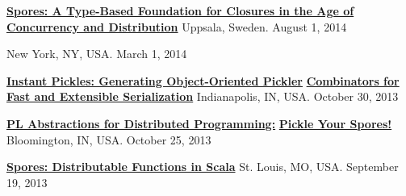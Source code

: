 \documentclass[9pt]{article}
\begin{document}
\noindent\href{https://speakerdeck.com/heathermiller/spores-a-type-based-foundation-for-closures-in-the-age-of-concurrency-and-distribution}{\bf Spores: A Type-Based Foundation for Closures in the Age of} \vspace{-0.03in}
\linebreak\noindent\href{https://speakerdeck.com/heathermiller/spores-a-type-based-foundation-for-closures-in-the-age-of-concurrency-and-distribution}{\bf Concurrency and Distribution}\dates{}
\linebreak\noindent Uppsala, Sweden. August 1, 2014
\bigskip

 \vspace{-0.03in}
\linebreak{}\dates{}
\linebreak\noindent New York, NY, USA. March 1, 2014
\bigskip

\noindent\href{https://speakerdeck.com/heathermiller/instant-pickles-generating-object-oriented-pickler-combinators-for-fast-and-extensible-serialization}{\bf Instant Pickles: Generating Object-Oriented Pickler} \vspace{-0.03in}
\linebreak\noindent\href{https://speakerdeck.com/heathermiller/instant-pickles-generating-object-oriented-pickler-combinators-for-fast-and-extensible-serialization}{\bf Combinators for Fast and Extensible Serialization}\dates{}
\linebreak\noindent Indianapolis, IN, USA. October 30, 2013
\bigskip

\noindent\href{http://heather.miller.am/files/IU-PL-Abstractions-for-Dist-Programming.pdf}{\bf PL Abstractions for Distributed Programming:} \vspace{-0.03in}
\linebreak\noindent\href{http://heather.miller.am/files/IU-PL-Abstractions-for-Dist-Programming.pdf}{\bf Pickle Your Spores!}\dates{}
\linebreak\noindent Bloomington, IN, USA. October 25, 2013
\bigskip


\noindent\href{https://speakerdeck.com/heathermiller/spores-distributable-functions-in-scala}{\bf Spores: Distributable Functions in Scala} 
\linebreak\noindent St. Louis, MO, USA. September 19, 2013
\bigskip
\end{document}
